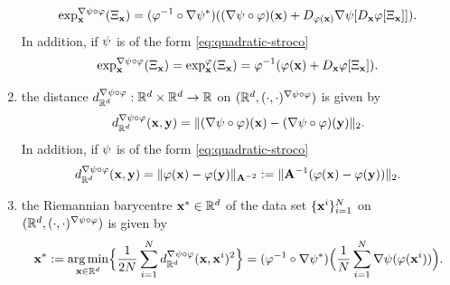 \begin{proposition}
\begin{enumerate}[label=(\roman*)]
            \begin{equation}
                 \exp^{\nabla \psi \circ \varphi}_{\mathbf{x}} (\Xi_{\mathbf{x}}) = (\varphi^{-1} \circ\nabla \psi^*)((\nabla \psi \circ \varphi)(\mathbf{x}) + D_{\varphi(\mathbf{x})} \nabla \psi [ D_{\mathbf{x}} \varphi[\Xi_{\mathbf{x}}] ]).
                 \label{eq:thm-exp-remetrised}
            \end{equation}
            In addition, if $\psi$ is of the form \ref{eq:quadratic-stroco}
            \begin{equation}
                 \exp^{\nabla \psi \circ \varphi}_{\mathbf{x}} (\Xi_{\mathbf{x}}) = \exp^\varphi_{\mathbf{x}} (\Xi_{\mathbf{x}}) = \varphi^{-1}(\varphi(\mathbf{x}) + D_{\mathbf{x}} \varphi[\Xi_{\mathbf{x}}]).
                 \label{eq:thm-exp-remetrised-special-psi}
            \end{equation}
            \item the distance $d^{\nabla \psi \circ \varphi}_{\mathbb{R}^d}:\mathbb{R}^d \times\mathbb{R}^d \to \mathbb{R}$ on $(\mathbb{R}^d, (\cdot,\cdot)^{\nabla \psi \circ \varphi})$ is given by 
            \begin{equation}
                d^{\nabla \psi \circ \varphi}_{\mathbb{R}^d}(\mathbf{x}, \mathbf{y}) = \|(\nabla \psi \circ \varphi)(\mathbf{x}) - (\nabla \psi \circ \varphi)(\mathbf{y})\|_2.
                \label{eq:thm-distance-remetrised}
            \end{equation}
            In addition, if $\psi$ is of the form \ref{eq:quadratic-stroco}
            \begin{equation}
                d^{\nabla \psi \circ \varphi}_{\mathbb{R}^d}(\mathbf{x}, \mathbf{y}) = \| \varphi(\mathbf{x}) -  \varphi(\mathbf{y})\|_{\mathbf{A}^{-2}} := \| \mathbf{A}^{-1} (\varphi(\mathbf{x}) -  \varphi(\mathbf{y}))\|_{2}.
                \label{eq:thm-distance-remetrised-special-psi}
            \end{equation}
            \item the Riemannian barycentre $\mathbf{x}^* \in \mathbb{R}^d$ of the data set $\{\mathbf{x}^i\}_{i=1}^N$ on $(\mathbb{R}^d, (\cdot,\cdot)^{\nabla \psi \circ \varphi})$ is given by
            \begin{equation}
                \Vector^* := \argmin_{\Vector\in \Real^\dimInd} \Bigl\{ \frac{1}{2\dataPointNum}\sum_{\sumIndA = 1}^\dataPointNum \distance_{\Real^\dimInd}^{\nabla\stroco\circ\diffeo}(\Vector, \Vector^\sumIndA)^2 \Bigr\} = (\diffeo^{-1} \circ\nabla \stroco^*)\Bigl(\frac{1}{\dataPointNum} \sum_{\sumIndA=1}^\dataPointNum \nabla \stroco(\diffeo(\Vector^\sumIndA)) \Bigr).

\end{equation}
\end{enumerate}
\end{proposition}
